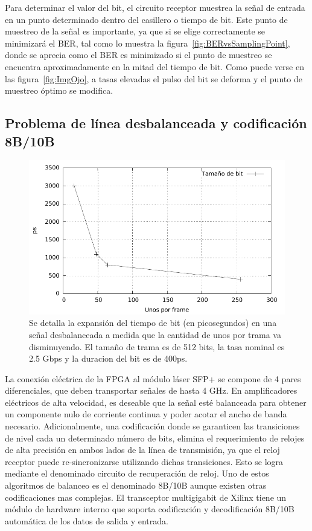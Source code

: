 Para determinar el valor del bit, el circuito receptor muestrea la señal de entrada en un punto determinado dentro del casillero o tiempo de bit. Este punto de muestreo de la señal es importante, ya que si se elige correctamente se minimizará el BER, tal como lo muestra la figura~\ref{fig:BERvsSamplingPoint}, donde se aprecia como el BER es minimizado si el punto de muestreo se encuentra aproximadamente en la mitad del tiempo de bit. 
Como puede verse en las figura~\ref{fig:ImgOjo}, a tasas elevadas el pulso del bit se deforma y el punto de muestreo óptimo se modifica.


\subsection{Problema de línea desbalanceada y codificación 8B/10B}
\label{problemacodificacion}
\begin{figure}[t]
  \centering
    \includegraphics[width=5in]{graphs/expansionbit.pdf}
\caption {Se detalla la expansión del tiempo de bit (en picosegundos) en una señal desbalanceada a medida que la cantidad de unos por trama va disminuyendo. El tamaño de trama es de 512 bits, la tasa nominal es 2.5 Gbps y la duracion del bit es de 400ps.}
\label{fig:expansionbit}
\end{figure}

\label{problema8b10b}
La conexión eléctrica de la FPGA al módulo láser SFP+ se compone de 4 pares diferenciales, que deben transportar señales de hasta 4 GHz. En amplificadores eléctricos de alta velocidad, es deseable que la señal esté balanceada para obtener un componente nulo de corriente continua y poder acotar el ancho de banda necesario. Adicionalmente, una codificación donde se garanticen las transiciones de nivel cada un determinado número de bits, elimina el requerimiento de relojes de alta precisión en ambos lados de la línea de transmisión, ya que el reloj receptor puede re-sincronizarse utilizando dichas transiciones. Esto se logra mediante el denominado circuito de recuperación de reloj.
Uno de estos algoritmos de balanceo es el denominado 8B/10B aunque existen otras codificaciones mas complejas. El transceptor multigigabit de Xilinx tiene un módulo de hardware interno que soporta codificación y decodificación 8B/10B automática de los datos de salida y entrada.


